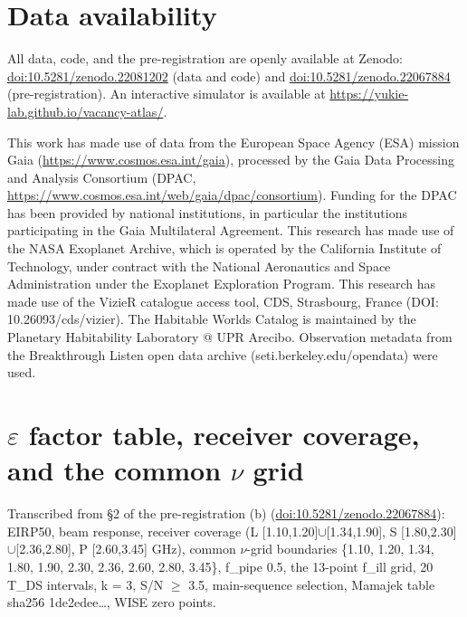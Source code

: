 \documentclass{aa}
\begin{document}
\section*{Data availability}
All data, code, and the pre-registration are openly available at Zenodo: \url{doi:10.5281/zenodo.22081202} (data and code) and \url{doi:10.5281/zenodo.22067884} (pre-registration). An interactive simulator is available at \url{https://yukie-lab.github.io/vacancy-atlas/}.
\begin{acknowledgements}
\noindent This work has made use of data from the European Space Agency (ESA) mission Gaia (\url{https://www.cosmos.esa.int/gaia}), processed by the Gaia Data Processing and Analysis Consortium (DPAC, \url{https://www.cosmos.esa.int/web/gaia/dpac/consortium}). Funding for the DPAC has been provided by national institutions, in particular the institutions participating in the Gaia Multilateral Agreement. This research has made use of the NASA Exoplanet Archive, which is operated by the California Institute of Technology, under contract with the National Aeronautics and Space Administration under the Exoplanet Exploration Program. This research has made use of the VizieR catalogue access tool, CDS, Strasbourg, France (DOI: 10.26093/cds/vizier). The Habitable Worlds Catalog is maintained by the Planetary Habitability Laboratory @ UPR Arecibo. Observation metadata from the Breakthrough Listen open data archive (seti.berkeley.edu/opendata) were used.\par\smallskip
\end{acknowledgements}
\nocite{*}


\appendix
\section{\(\varepsilon\) factor table, receiver coverage, and the common \(\nu\) grid}
\noindent Transcribed from \S{}2 of the pre-registration (b) (\url{doi:10.5281/zenodo.22067884}): EIRP50, beam response, receiver coverage (L [1.10,1.20]\(\cup\)[1.34,1.90], S [1.80,2.30]\(\cup\)[2.36,2.80], P [2.60,3.45] GHz), common \(\nu\)-grid boundaries \{1.10, 1.20, 1.34, 1.80, 1.90, 2.30, 2.36, 2.60, 2.80, 3.45\}, f\_pipe 0.5, the 13-point f\_ill grid, 20 T\_DS intervals, k = 3, S/N \(\geq\) 3.5, main-sequence selection, Mamajek table sha256 1de2edee\ldots{}, WISE zero points.\par\smallskip
\end{document}
